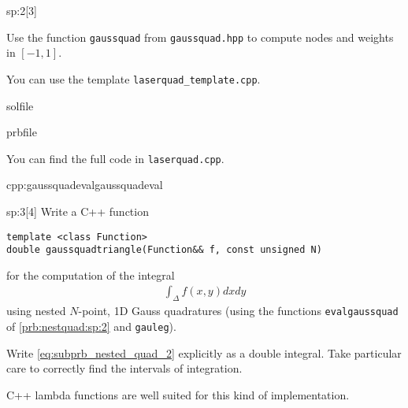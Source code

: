\begin{samproblem}
\begin{subproblem}{sp:2}[3]
  \begin{samhint}
    Use the function \verb|gaussquad| from \verb|gaussquad.hpp| to compute nodes and weights in $[-1,1]$.
  \end{samhint}
  
  \begin{samhint}
    You can use the template \verb|laserquad_template.cpp|.
  \end{samhint}
  
  \begin{samwriteprbpart}{solfile}
    \begin{writeverbatim}{prbfile}
      \begin{samsolution}
        You can find the full code in \verb|laserquad.cpp|.

        \begin{samcode}[C++-code]{cpp:gaussquadeval}{gaussquadeval}
          \small
        \end{samcode}
      \end{samsolution}
    \end{writeverbatim}
  \end{samwriteprbpart}

\end{subproblem}

\begin{subproblem}{sp:3}[4]
  Write a C++ function
  \begin{lstlisting}[style=cpp]
template <class Function>
double gaussquadtriangle(Function&& f, const unsigned N)
  \end{lstlisting}
  for the computation of the integral
  \begin{align} \label{eq:subprb_nested_quad_2}
    \int_\Delta f(x,y) dx dy
  \end{align}
  using nested $N$-point, 1D Gauss quadratures (using the functions \verb|evalgaussquad| of \ref{prb:nestquad:sp:2} and  \verb|gauleg|).
  
  \begin{samhint}
    Write \eqref{eq:subprb_nested_quad_2} explicitly as a double integral. Take particular care to correctly find the intervals of integration.
  \end{samhint}
  
  \begin{samhint}
    C++ lambda functions are well suited for this kind of implementation.
  \end{samhint}


\end{subproblem}
\end{samproblem}
